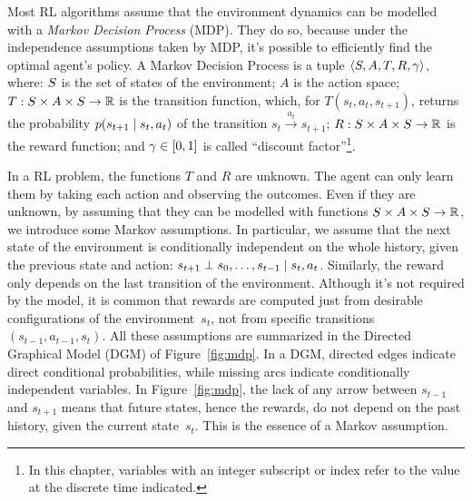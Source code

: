 Most RL algorithms assume that the environment dynamics can be modelled with a
\emph{Markov Decision Process} (MDP). They do so, because under the
independence assumptions taken by MDP, it's possible to efficiently find the
optimal agent's policy. A Markov Decision Process is a tuple $\langle S,
A, T, R, \gamma \rangle$, where: $S$ is the set of states of the
environment; $A$ is the action space; $T: S \times A \times S \to
\mathbb{R}$ is the transition function, which, for ${T(s_{t}, a_{t}, s_{t+1})}$,
returns the probability $p(s_{t+1} \mid s_{t}, a_{t})$ of the transition
${s_{t} \xrightarrow{a_{t}} s_{t+1}}$; $R: S \times A \times S \to
\mathbb{R}$ is the reward function; and $\gamma \in [0, 1]$ is called ``discount
factor''\footnote{In this chapter, variables with an integer subscript or
index refer to the value at the discrete time indicated.}.

In a RL problem, the functions $T$ and $R$ are unknown. The agent can only
learn them by taking each action and observing the outcomes. Even if they are
unknown, by assuming that they can be modelled with functions ${S \times
A \times S \to \mathbb{R}}$, we introduce some Markov assumptions. In
particular, we assume that the next state of the environment is conditionally
independent on the whole history, given the previous state and action:
$s_{t+1} \perp s_{0}, \dots, s_{t-1} \mid s_{t}, a_{t}$. Similarly, the
reward only depends on the last transition of the environment.  Although it's
not required by the model, it is common that rewards are computed just from
desirable configurations of the environment~$s_{t}$, not from specific
transitions $(s_{t-1}, a_{t-1}, s_{t})$. All these assumptions are summarized
in the Directed Graphical Model (DGM) of Figure~\ref{fig:mdp}. In a DGM,
directed edges indicate direct conditional probabilities, while missing arcs
indicate conditionally independent variables.  In Figure~\ref{fig:mdp}, the
lack of any arrow between $s_{t-1}$ and $s_{t+1}$ means that future states,
hence the rewards, do not depend on the past history, given the current
state~$s_t$.  This is the essence of a Markov assumption.

